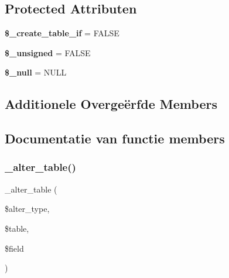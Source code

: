 \subsection*{Protected Attributen}
\begin{DoxyCompactItemize}
\item 
\mbox{\label{class_c_i___d_b__sqlite__forge_a2f6484fcb8d1dc3eef67a637227cd583}} 
{\bfseries \$\+\_\+create\+\_\+table\+\_\+if} = F\+A\+L\+SE
\item 
\mbox{\label{class_c_i___d_b__sqlite__forge_aae977ae6d61fa183f0b25422b6ddc31c}} 
{\bfseries \$\+\_\+unsigned} = F\+A\+L\+SE
\item 
\mbox{\label{class_c_i___d_b__sqlite__forge_ae58fe6a5104d4a069a49b27533ce808f}} 
{\bfseries \$\+\_\+null} = \textquotesingle{}N\+U\+LL\textquotesingle{}
\end{DoxyCompactItemize}
\subsection*{Additionele Overge\"{e}rfde Members}


\subsection{Documentatie van functie members}
\mbox{\label{class_c_i___d_b__sqlite__forge_a41c6cae02f2fda8b429ad0afb9509426}} 
\subsubsection{\texorpdfstring{\_alter\_table()}{\_alter\_table()}}
{\footnotesize\ttfamily \+\_\+alter\+\_\+table (\begin{DoxyParamCaption}\item[{}]{\$alter\+\_\+type,  }\item[{}]{\$table,  }\item[{}]{\$field }\end{DoxyParamCaption})\hspace{0.3cm}{\ttfamily [protected]}}

